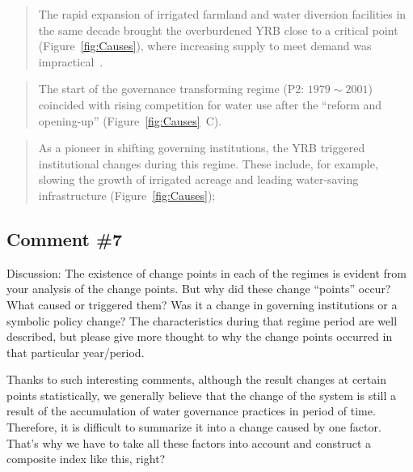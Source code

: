 \begin{quote}
    The rapid expansion of irrigated farmland and water diversion facilities in the same decade brought the overburdened YRB close to a critical point (Figure~\ref{fig:Causes}), where increasing supply to meet demand was impractical~\cite{loch2020}.
\end{quote}

\begin{quote}
    The start of the governance transforming regime (P2: $1979 \sim 2001$) coincided with rising competition for water use after the ``reform and opening-up'' (Figure~\ref{fig:Causes}~C).
\end{quote}

\begin{quote}
    As a pioneer in shifting governing institutions, the YRB triggered institutional changes during this regime. These include, for example, slowing the growth of irrigated acreage and leading water-saving infrastructure (Figure~\ref{fig:Causes});
\end{quote}

\subsection{Comment \#7}
\RC{} Discussion: The existence of change points in each of the regimes is evident from your analysis of the change points. But why did these change ``points'' occur? What caused or triggered them? Was it a change in governing institutions or a symbolic policy change? The characteristics during that regime period are well described, but please give more thought to why the change points occurred in that particular year/period.

\AR{} Thanks to such interesting comments, although the result changes at certain points statistically, we generally believe that the change of the system is still a result of the accumulation of water governance practices in period of time. Therefore, it is difficult to summarize it into a change caused by one factor. That's why we have to take all these factors into account and construct a composite index like this, right?

